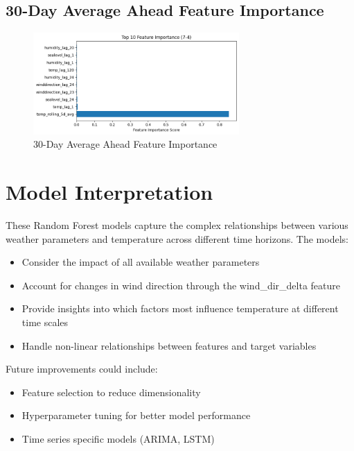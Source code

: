 \subsection{30-Day Average Ahead Feature Importance}
\begin{figure}[htbp]
\centering
\includegraphics[width=0.7\textwidth]{7-4-random_forest_temp_feature_importance.png}
\caption{30-Day Average Ahead Feature Importance}
\label{fig:30-day_average_ahead_featimp}
\end{figure}


\section{Model Interpretation}

These Random Forest models capture the complex relationships between various weather parameters and temperature across different time horizons. The models:\
\begin{itemize}
  \item Consider the impact of all available weather parameters
  \item Account for changes in wind direction through the wind\_dir\_delta feature
  \item Provide insights into which factors most influence temperature at different time scales
  \item Handle non-linear relationships between features and target variables
\end{itemize}
Future improvements could include:\
\begin{itemize}
  \item Feature selection to reduce dimensionality
  \item Hyperparameter tuning for better model performance
  \item Time series specific models (ARIMA, LSTM)
\end{itemize}

